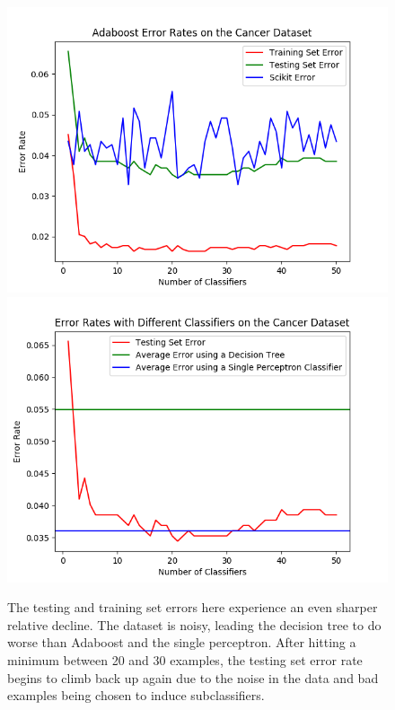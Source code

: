 \documentclass{article}
\begin{document}
\begin{figure}[hbt]
\centering
\includegraphics[scale=0.7]{Cancer_1}
\includegraphics[scale=0.7]{Cancer_different_classifiers_1} 
\caption{The testing and training set errors here experience an even sharper relative decline. The dataset is noisy, leading the decision tree to do worse than Adaboost and the single perceptron. After hitting a minimum between 20 and 30 examples, the testing set error rate begins to climb back up again due to the noise in the data and bad examples being chosen to induce subclassifiers.}
\end{figure}
\end{document}
